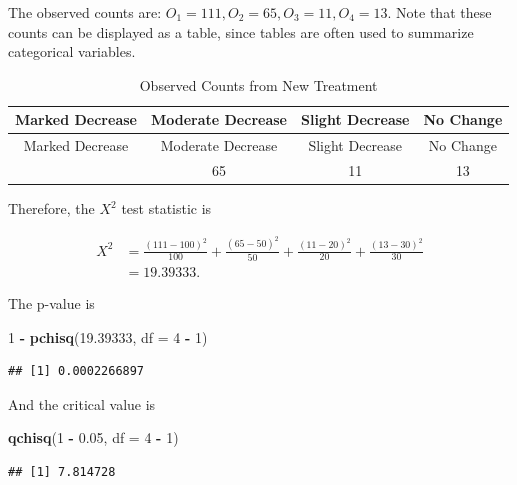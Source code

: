 \documentclass[
]{book}
\newenvironment{Shaded}{\begin{snugshade}}{\end{snugshade}}
\newcommand{\AttributeTok}[1]{\textcolor[rgb]{0.13,0.29,0.53}{#1}}
\newcommand{\DecValTok}[1]{\textcolor[rgb]{0.00,0.00,0.81}{#1}}
\newcommand{\FloatTok}[1]{\textcolor[rgb]{0.00,0.00,0.81}{#1}}
\newcommand{\FunctionTok}[1]{\textcolor[rgb]{0.13,0.29,0.53}{\textbf{#1}}}
\newcommand{\NormalTok}[1]{#1}
\newcommand{\SpecialCharTok}[1]{\textcolor[rgb]{0.81,0.36,0.00}{\textbf{#1}}}
\theoremstyle{definition}
\theoremstyle{definition}
\theoremstyle{definition}
\theoremstyle{definition}
\theoremstyle{remark}
\begin{document}
The observed counts are: \(O_1 = 111, O_2 = 65, O_3 = 11, O_4 = 13\). Note that these counts can be displayed as a table, since tables are often used to summarize categorical variables.

\begin{longtable}[]{@{}cccc@{}}
\caption{\label{tab:egGOF2} Observed Counts from New Treatment}\tabularnewline
\toprule\noalign{}
Marked Decrease & Moderate Decrease & Slight Decrease & No Change \\
\midrule\noalign{}
\endfirsthead
\toprule\noalign{}
Marked Decrease & Moderate Decrease & Slight Decrease & No Change \\
\midrule\noalign{}
\endhead
\bottomrule\noalign{}
\endlastfoot
111 & 65 & 11 & 13 \\
\end{longtable}

Therefore, the \(X^2\) test statistic is

\[
\begin{split}
X^2 &= \frac{(111 - 100)^2}{100} + \frac{(65 - 50)^2}{50} + \frac{(11- 20)^2}{20} + \frac{(13- 30)^2}{30} \\
        &= 19.39333.
\end{split}
\]

The p-value is

\begin{Shaded}
\begin{Highlighting}[]
\DecValTok{1} \SpecialCharTok{{-}} \FunctionTok{pchisq}\NormalTok{(}\FloatTok{19.39333}\NormalTok{, }\AttributeTok{df =} \DecValTok{4} \SpecialCharTok{{-}} \DecValTok{1}\NormalTok{)}
\end{Highlighting}
\end{Shaded}

\begin{verbatim}
## [1] 0.0002266897
\end{verbatim}

And the critical value is

\begin{Shaded}
\begin{Highlighting}[]
\FunctionTok{qchisq}\NormalTok{(}\DecValTok{1} \SpecialCharTok{{-}} \FloatTok{0.05}\NormalTok{, }\AttributeTok{df =} \DecValTok{4} \SpecialCharTok{{-}} \DecValTok{1}\NormalTok{)}
\end{Highlighting}
\end{Shaded}

\begin{verbatim}
## [1] 7.814728
\end{verbatim}
\end{document}
